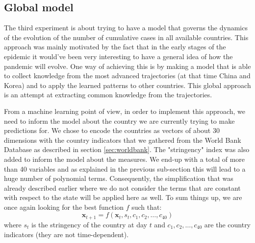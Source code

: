 \documentclass[12pt, letterpaper]{article}
\begin{document}
\subsection{Global model}\label{sec:global}

The third experiment is about trying to have a model that governs the dynamics of the evolution of the number of cumulative cases in all available countries.
This approach was mainly motivated by the fact that in the early stages of the epidemic it would've been very interesting to have a general idea of how the pandemic will evolve.
One way of achieving this is by making a model that is able to collect knowledge from the most advanced trajectories (at that time China and Korea) and to apply the learned patterns to other countries.
This global approach is an attempt at extracting common knowledge from the trajectories.

From a machine learning point of view, in order to implement this approach, we need to inform the model about the country we are currently trying to make predictions for.
We chose to encode the countries as vectors of about 30 dimensions with the country indicators that we gathered from the World Bank Database as described in section \ref{sec:worldbank}.
The "stringency" index was also added to inform the model about the measures.
We end-up with a total of more than 40 variables and as explained in the previous sub-section this will lead to a huge number of polynomial terms.
Consequently, the simplification that was already described earlier where we do not consider the terms that are constant with respect to the state will be applied here as well.
To sum things up, we are once again looking for the best function $f$ such that:
$$\mathbf{x}_{t+1} = f(\mathbf{x}_t, s_t, c_1, c_2, \dots, c_{40})$$
where $s_t$ is the stringency of the country at day $t$ and $c_1, c_2, \dots, c_{40}$ are the country indicators (they are not time-dependent).
\end{document}
